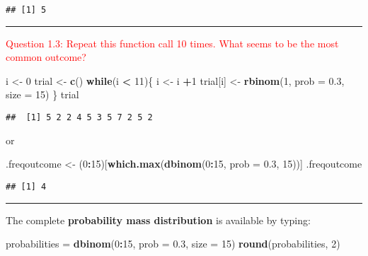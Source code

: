 \documentclass[]{article}
\newenvironment{Shaded}{\begin{snugshade}}{\end{snugshade}}
\newcommand{\KeywordTok}[1]{\textcolor[rgb]{0.13,0.29,0.53}{\textbf{#1}}}
\newcommand{\DataTypeTok}[1]{\textcolor[rgb]{0.13,0.29,0.53}{#1}}
\newcommand{\DecValTok}[1]{\textcolor[rgb]{0.00,0.00,0.81}{#1}}
\newcommand{\FloatTok}[1]{\textcolor[rgb]{0.00,0.00,0.81}{#1}}
\newcommand{\StringTok}[1]{\textcolor[rgb]{0.31,0.60,0.02}{#1}}
\newcommand{\ControlFlowTok}[1]{\textcolor[rgb]{0.13,0.29,0.53}{\textbf{#1}}}
\newcommand{\OperatorTok}[1]{\textcolor[rgb]{0.81,0.36,0.00}{\textbf{#1}}}
\newcommand{\NormalTok}[1]{#1}
\let\oldrule=\rule
\renewcommand{\rule}[1]{\oldrule{\linewidth}}
\begin{document}
\begin{verbatim}
## [1] 5
\end{verbatim}

\begin{center}\rule{0.5\linewidth}{\linethickness}\end{center}

\textcolor{red}{Question 1.3: Repeat this function call 10 times. What seems to be the most common outcome?}

\begin{Shaded}
\begin{Highlighting}[]
\NormalTok{i <-}\StringTok{ }\DecValTok{0}
\NormalTok{trial <-}\StringTok{ }\KeywordTok{c}\NormalTok{()}
\ControlFlowTok{while}\NormalTok{(i }\OperatorTok{<}\StringTok{ }\DecValTok{11}\NormalTok{)\{}
\NormalTok{  i <-}\StringTok{ }\NormalTok{i }\OperatorTok{+}\DecValTok{1}
\NormalTok{  trial[i] <-}\StringTok{ }\KeywordTok{rbinom}\NormalTok{(}\DecValTok{1}\NormalTok{, }\DataTypeTok{prob =} \FloatTok{0.3}\NormalTok{, }\DataTypeTok{size =} \DecValTok{15}\NormalTok{)}
\NormalTok{\}}
\NormalTok{  trial}
\end{Highlighting}
\end{Shaded}

\begin{verbatim}
##  [1] 5 2 2 4 5 3 5 7 2 5 2
\end{verbatim}

or

\begin{Shaded}
\begin{Highlighting}[]
\NormalTok{.freqoutcome <-}\StringTok{ }\NormalTok{(}\DecValTok{0}\OperatorTok{:}\DecValTok{15}\NormalTok{)[}\KeywordTok{which.max}\NormalTok{(}\KeywordTok{dbinom}\NormalTok{(}\DecValTok{0}\OperatorTok{:}\DecValTok{15}\NormalTok{, }\DataTypeTok{prob =} \FloatTok{0.3}\NormalTok{, }\DecValTok{15}\NormalTok{))]}
\NormalTok{.freqoutcome}
\end{Highlighting}
\end{Shaded}

\begin{verbatim}
## [1] 4
\end{verbatim}

\begin{center}\rule{0.5\linewidth}{\linethickness}\end{center}

The complete \textbf{probability mass distribution} is available by
typing:

\begin{Shaded}
\begin{Highlighting}[]
\NormalTok{probabilities =}\StringTok{ }\KeywordTok{dbinom}\NormalTok{(}\DecValTok{0}\OperatorTok{:}\DecValTok{15}\NormalTok{, }\DataTypeTok{prob =} \FloatTok{0.3}\NormalTok{, }\DataTypeTok{size =} \DecValTok{15}\NormalTok{)}
\KeywordTok{round}\NormalTok{(probabilities, }\DecValTok{2}\NormalTok{)}
\end{Highlighting}
\end{Shaded}
\end{document}
